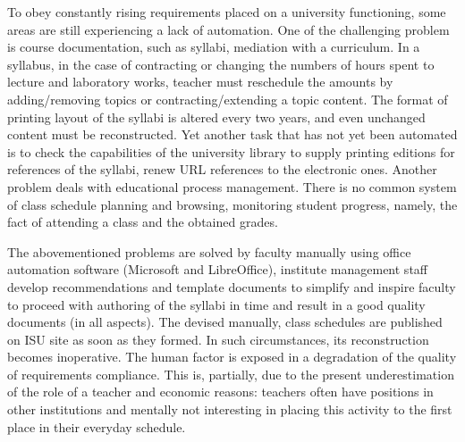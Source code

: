 \documentclass[
]{ceurart}
\begin{document}
To obey constantly rising requirements placed on a university functioning, some areas are still experiencing a lack of automation. One of the challenging problem is course documentation, such as syllabi, mediation with a curriculum. In a syllabus, in the case of contracting or changing the numbers of hours spent to lecture and laboratory works, teacher must reschedule the amounts by adding/removing topics or contracting/extending a topic content.  The format of printing layout of the syllabi is altered every two years, and even unchanged content must be reconstructed.  Yet another task that has not yet been automated is to check the capabilities of the university library to supply printing editions for references of the syllabi, renew URL references to the electronic ones.  Another problem deals with educational process management.  There is no common system of class schedule planning and browsing, monitoring student progress, namely, the fact of attending a class and the obtained grades.  %

The abovementioned problems are solved by faculty manually using office automation software (Microsoft and LibreOffice), institute management staff develop recommendations and template documents to simplify and inspire faculty to proceed with authoring of the syllabi in time and result in a good quality documents (in all aspects).  The devised manually, class schedules are published on ISU site as soon as they formed.  In such circumstances, its reconstruction becomes inoperative.   %
The human factor is exposed in a degradation of the quality of requirements compliance.  This is, partially, due to the present underestimation of the role of a teacher and economic reasons: teachers often have positions in other institutions and mentally not interesting in placing this activity to the first place in their everyday schedule.
\end{document}
